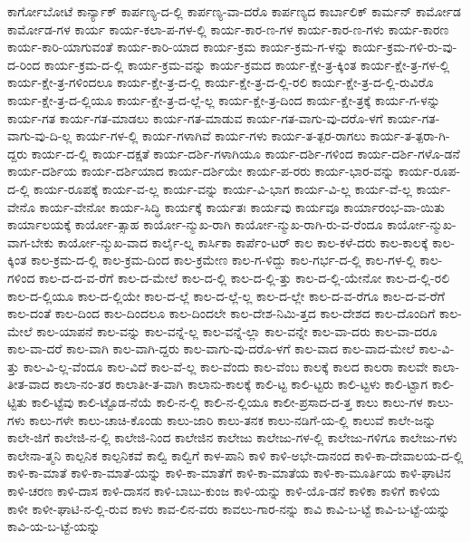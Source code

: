 {ಕಾರ್ಗೋಬೋಟೆ
ಕಾರ್ನ್ಯಾಕ್
ಕಾರ್ಪಣ್ಯ-ದ-ಲ್ಲಿ
ಕಾರ್ಪಣ್ಯ-ವಾ-ದರೊ
ಕಾರ್ಪಣ್ಯದ
ಕಾರ್ಬಾಲಿಕ್
ಕಾರ್ಮನ್
ಕಾರ್ಮೋಡ
ಕಾರ್ಮೋಡ-ಗಳ
ಕಾರ್ಯ
ಕಾರ್ಯ-ಕಲಾ-ಪ-ಗಳ-ಲ್ಲಿ
ಕಾರ್ಯ-ಕಾರ-ಣ-ಗಳ
ಕಾರ್ಯ-ಕಾರ-ಣ-ಗಳು
ಕಾರ್ಯ-ಕಾರಣ
ಕಾರ್ಯ-ಕಾರಿ-ಯಾಗುವಂತೆ
ಕಾರ್ಯ-ಕಾರಿ-ಯಾದ
ಕಾರ್ಯ-ಕ್ರಮ
ಕಾರ್ಯ-ಕ್ರಮ-ಗ-ಳನ್ನು
ಕಾರ್ಯ-ಕ್ರಮ-ಗಳಿ-ರು-ವು-ದ-ರಿಂದ
ಕಾರ್ಯ-ಕ್ರಮ-ದ-ಲ್ಲಿ
ಕಾರ್ಯ-ಕ್ರಮ-ವನ್ನು
ಕಾರ್ಯ-ಕ್ರಮದ
ಕಾರ್ಯ-ಕ್ಷೇ-ತ್ರ-ಕ್ಕಿಂತ
ಕಾರ್ಯ-ಕ್ಷೇ-ತ್ರ-ಗಳ-ಲ್ಲಿ
ಕಾರ್ಯ-ಕ್ಷೇ-ತ್ರ-ಗಳಿಂದಲೂ
ಕಾರ್ಯ-ಕ್ಷೇ-ತ್ರ-ದ-ಲ್ಲಿ
ಕಾರ್ಯ-ಕ್ಷೇ-ತ್ರ-ದ-ಲ್ಲಿ-ರಲಿ
ಕಾರ್ಯ-ಕ್ಷೇ-ತ್ರ-ದ-ಲ್ಲಿ-ರುವಿರೊ
ಕಾರ್ಯ-ಕ್ಷೇ-ತ್ರ-ದ-ಲ್ಲಿಯೂ
ಕಾರ್ಯ-ಕ್ಷೇ-ತ್ರ-ದ-ಲ್ಲೆ-ಲ್ಲ
ಕಾರ್ಯ-ಕ್ಷೇ-ತ್ರ-ದಿಂದ
ಕಾರ್ಯ-ಕ್ಷೇ-ತ್ರಕ್ಕೆ
ಕಾರ್ಯ-ಗ-ಳನ್ನು
ಕಾರ್ಯ-ಗತ
ಕಾರ್ಯ-ಗತ-ಮಾಡಲು
ಕಾರ್ಯ-ಗತ-ಮಾಡುವ
ಕಾರ್ಯ-ಗತ-ವಾಗು-ವು-ದರೊ-ಳಗೆ
ಕಾರ್ಯ-ಗತ-ವಾಗು-ವು-ದಿ-ಲ್ಲ
ಕಾರ್ಯ-ಗಳ-ಲ್ಲಿ
ಕಾರ್ಯ-ಗಳಾಗಿವೆ
ಕಾರ್ಯ-ಗಳು
ಕಾರ್ಯ-ತ-ತ್ಪರ-ರಾಗಲು
ಕಾರ್ಯ-ತ-ತ್ಪರಾ-ಗಿ-ದ್ದರು
ಕಾರ್ಯ-ದ-ಲ್ಲಿ
ಕಾರ್ಯ-ದಕ್ಷತೆ
ಕಾರ್ಯ-ದರ್ಶಿ-ಗಳಾಗಿಯೂ
ಕಾರ್ಯ-ದರ್ಶಿ-ಗಳಿಂದ
ಕಾರ್ಯ-ದರ್ಶಿ-ಗಳೊ-ಡನೆ
ಕಾರ್ಯ-ದರ್ಶಿಯ
ಕಾರ್ಯ-ದರ್ಶಿಯಾದ
ಕಾರ್ಯ-ದರ್ಶಿಯೇ
ಕಾರ್ಯ-ಪ-ರರು
ಕಾರ್ಯ-ಭಾರ-ವನ್ನು
ಕಾರ್ಯ-ರೂಪ-ದ-ಲ್ಲಿ
ಕಾರ್ಯ-ರೂಪಕ್ಕೆ
ಕಾರ್ಯ-ವ-ಲ್ಲ
ಕಾರ್ಯ-ವನ್ನು
ಕಾರ್ಯ-ವಿ-ಭಾಗ
ಕಾರ್ಯ-ವಿ-ಲ್ಲ
ಕಾರ್ಯ-ವೆ-ಲ್ಲ
ಕಾರ್ಯ-ವೇನೊ
ಕಾರ್ಯ-ವೇನೋ
ಕಾರ್ಯ-ಸಿದ್ಧಿ
ಕಾರ್ಯಕ್ಕೆ
ಕಾರ್ಯತಃ
ಕಾರ್ಯವು
ಕಾರ್ಯವೂ
ಕಾರ್ಯಾರಂಭ-ವಾ-ಯಿತು
ಕಾರ್ಯಾಲಯಕ್ಕೆ
ಕಾರ್ಯೋ-ತ್ಸಾಹ
ಕಾರ್ಯೋ-ನ್ಮುಖ-ರಾಗಿ
ಕಾರ್ಯೋ-ನ್ಮುಖ-ರಾಗಿ-ರು-ವ-ರೆಂದೂ
ಕಾರ್ಯೋ-ನ್ಮುಖ-ವಾಗ-ಬೇಕು
ಕಾರ್ಯೋ-ನ್ಮುಖ-ವಾದ
ಕಾರ್ಲೈ-ಲ್ನ
ಕಾರ್ಸಿಕಾ
ಕಾರ್ಪೆಂ-ಟರ್
ಕಾಲ
ಕಾಲ-ಕಳೆ-ದರು
ಕಾಲ-ಕಾಲಕ್ಕೆ
ಕಾಲ-ಕ್ಕಿಂತ
ಕಾಲ-ಕ್ರಮ-ದ-ಲ್ಲಿ
ಕಾಲ-ಕ್ರಮ-ದಿಂದ
ಕಾಲ-ಕ್ರಮೇಣ
ಕಾಲ-ಗ-ಳಿದ್ದು
ಕಾಲ-ಗರ್ಭ-ದ-ಲ್ಲಿ
ಕಾಲ-ಗಳ-ಲ್ಲಿ
ಕಾಲ-ಗಳಿಂದ
ಕಾಲ-ದ-ದ-ವ-ರೆಗೆ
ಕಾಲ-ದ-ಮೇಲೆ
ಕಾಲ-ದ-ಲ್ಲಿ
ಕಾಲ-ದ-ಲ್ಲಿ-ತ್ತು
ಕಾಲ-ದ-ಲ್ಲಿ-ಯೇನೋ
ಕಾಲ-ದ-ಲ್ಲಿ-ರಲಿ
ಕಾಲ-ದ-ಲ್ಲಿಯೂ
ಕಾಲ-ದ-ಲ್ಲಿಯೇ
ಕಾಲ-ದ-ಲ್ಲೆ
ಕಾಲ-ದ-ಲ್ಲೆ-ಲ್ಲ
ಕಾಲ-ದ-ಲ್ಲೇ
ಕಾಲ-ದ-ವ-ರೆಗೂ
ಕಾಲ-ದ-ವ-ರೆಗೆ
ಕಾಲ-ದಂತೆ
ಕಾಲ-ದಿಂದ
ಕಾಲ-ದಿಂದಲೂ
ಕಾಲ-ದಿಂದಲೇ
ಕಾಲ-ದೇಶ-ನಿಮಿ-ತ್ತದ
ಕಾಲ-ದೇಶದ
ಕಾಲ-ದೊಂದಿಗೆ
ಕಾಲ-ಮೇಲೆ
ಕಾಲ-ಯಾಪನೆ
ಕಾಲ-ವನ್ನು
ಕಾಲ-ವನ್ನೆ-ಲ್ಲ
ಕಾಲ-ವನ್ನೆ-ಲ್ಲಾ
ಕಾಲ-ವನ್ನೇ
ಕಾಲ-ವಾ-ದರು
ಕಾಲ-ವಾ-ದರೂ
ಕಾಲ-ವಾ-ದರೆ
ಕಾಲ-ವಾಗಿ
ಕಾಲ-ವಾಗಿ-ದ್ದರು
ಕಾಲ-ವಾಗು-ವು-ದರೊ-ಳಗೆ
ಕಾಲ-ವಾದ
ಕಾಲ-ವಾದ-ಮೇಲೆ
ಕಾಲ-ವಿ-ತ್ತು
ಕಾಲ-ವಿ-ಲ್ಲ-ವೆಂದೂ
ಕಾಲ-ವಿದೆ
ಕಾಲ-ವೆ-ಲ್ಲ
ಕಾಲ-ವೆಂದು
ಕಾಲ-ವೆಂಬ
ಕಾಲಕ್ಕೆ
ಕಾಲದ
ಕಾಲರಾ
ಕಾಲವೇ
ಕಾಲಾ-ತೀತ-ವಾದ
ಕಾಲಾ-ನಂ-ತರ
ಕಾಲಾತೀ-ತ-ವಾಗಿ
ಕಾಲಾನು-ಕಾಲಕ್ಕೆ
ಕಾಲಿ-ಟ್ಟ
ಕಾಲಿ-ಟ್ಟರು
ಕಾಲಿ-ಟ್ಟಳು
ಕಾಲಿ-ಟ್ಟಾಗ
ಕಾಲಿ-ಟ್ಟಿತು
ಕಾಲಿ-ಟ್ಟೆವು
ಕಾಲಿ-ಟ್ಟೊಡ-ನೆಯೆ
ಕಾಲಿ-ನ-ಲ್ಲಿ
ಕಾಲಿ-ನ-ಲ್ಲಿಯೂ
ಕಾಲೀ-ಪ್ರಸಾದ-ದ-ತ್ತ
ಕಾಲು
ಕಾಲು-ಗಳ
ಕಾಲು-ಗಳು
ಕಾಲು-ಗಳೇ
ಕಾಲು-ಚಾಚಿ-ಕೊಂಡು
ಕಾಲು-ಜಾರಿ
ಕಾಲು-ತನಕ
ಕಾಲು-ನಡಿಗೆ-ಯ-ಲ್ಲಿ
ಕಾಲುವೆ
ಕಾಲೇ-ಜನ್ನು
ಕಾಲೇ-ಜಿಗೆ
ಕಾಲೇಜಿ-ನ-ಲ್ಲಿ
ಕಾಲೇಜಿ-ನಿಂದ
ಕಾಲೇಜಿನ
ಕಾಲೇಜು
ಕಾಲೇಜು-ಗಳ-ಲ್ಲಿ
ಕಾಲೇಜು-ಗಳಿಗೂ
ಕಾಲೇಜು-ಗಳು
ಕಾಲೇನಾ-ತ್ಮನಿ
ಕಾಲ್ಪನಿಕ
ಕಾಲ್ಪನಿಕವೆ
ಕಾಲ್ವಿ
ಕಾಲ್ವಿಗೆ
ಕಾಳ-ಪಾನಿ
ಕಾಳಿ
ಕಾಳಿ-ಅಭೇ-ದಾನಂದ
ಕಾಳಿ-ಕಾ-ದೇವಾಲಯ-ದ-ಲ್ಲಿ
ಕಾಳಿ-ಕಾ-ಮಾತೆ
ಕಾಳಿ-ಕಾ-ಮಾತೆ-ಯನ್ನು
ಕಾಳಿ-ಕಾ-ಮಾತೆಗೆ
ಕಾಳಿ-ಕಾ-ಮಾತೆಯ
ಕಾಳಿ-ಕಾ-ಮೂರ್ತಿಯ
ಕಾಳಿ-ಘಾಟಿನ
ಕಾಳಿ-ಚರಣ
ಕಾಳಿ-ದಾಸ
ಕಾಳಿ-ದಾಸನ
ಕಾಳಿ-ಬಾಬು-ಕುಂಜ
ಕಾಳಿ-ಯನ್ನು
ಕಾಳಿ-ಯೊ-ಡನೆ
ಕಾಳಿಕಾ
ಕಾಳಿಗೆ
ಕಾಳಿಯ
ಕಾಳೀ
ಕಾಳೀ-ಘಾಟಿ-ನ-ಲ್ಲಿ-ರುವ
ಕಾಳು
ಕಾವ-ಲಿನ-ವರು
ಕಾವಲು-ಗಾರ-ನನ್ನು
ಕಾವಿ
ಕಾವಿ-ಬ-ಟ್ಟೆ
ಕಾವಿ-ಬ-ಟ್ಟೆ-ಯನ್ನು
ಕಾವಿ-ಯ-ಬ-ಟ್ಟೆ-ಯನ್ನು
}
